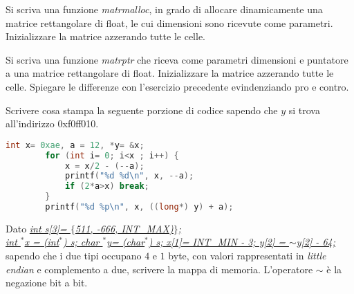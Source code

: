\documentclass[addpoints,11pt]{exam}
\begin{document}
\begin{questions}
\question[2] Si scriva una funzione \emph{matrmalloc}, in grado di allocare dinamicamente una matrice rettangolare di float, le cui dimensioni sono ricevute come parametri. Inizializzare la matrice azzerando tutte le celle.
\makeemptybox{100pt}



\question[4] Si scriva una funzione \emph{matrptr} che riceva come parametri dimensioni e puntatore a una matrice rettangolare di float. Inizializzare la matrice azzerando tutte le celle. Spiegare le differenze con l'esercizio precedente evindenziando pro e contro.
\makeemptybox{125pt}



\question[4]
Scrivere cosa stampa la seguente porzione di codice sapendo che $y$ si trova all'indirizzo 0xf0ff010.

\begin{minipage}[t]{0.5\linewidth}
	\begin{lstlisting}[language=C]
		int x= 0xae, a = 12, *y= &x;
		for (int i= 0; i<x ; i++) {
			x = x/2 - (--a);
			printf("%d %d\n", x, --a);
			if (2*a>x) break;
		}
		printf("%d %p\n", x, ((long*) y) + a);
	\end{lstlisting}
\end{minipage}
\begin{minipage}[t]{0.5\linewidth}
	\makeemptybox{100pt}
\end{minipage}



\question[4]
Dato \underline{\emph{int s[3]= $\{$511, -666, INT\_MAX)$\}$;}}\\
\underline{\emph{int  $^*$x = (int$^*$) s;
		char $^*$y= (char$^*$) s;
		x[1]= INT\_MIN - 3; y[2] = $\sim$y[2] - 64;}}  
sapendo che i due tipi occupano $4$ e $1$ byte, con valori rappresentati in \emph{little endian} e complemento a due, scrivere la mappa di memoria. L'operatore $\sim$ è la negazione bit a bit.
\end{questions}
\end{document}
